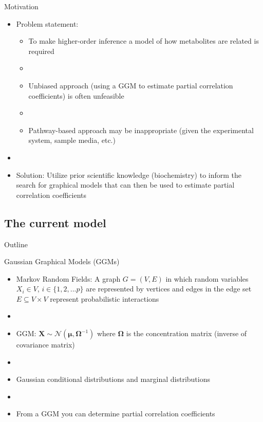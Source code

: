 \documentclass[xcolor=dvipsnames]{beamer}
\begin{document}
\begin{frame}{Motivation}
	\vspace{-15.5pt}
	\begin{itemize}
		\item Problem statement: \pause
		\begin{itemize}
			\item To make higher-order inference a model of how metabolites are related is required \pause
			\item[]
			\item Unbiased approach (using a GGM to estimate partial correlation coefficients) is often unfeasible \pause
			\item[]
			\item Pathway-based approach may be inappropriate (given the experimental system, sample media, etc.) \pause
		\end{itemize}
		\item[]
		\item Solution: Utilize prior scientific knowledge (biochemistry) to inform the search for graphical models that can then be used to estimate partial correlation coefficients
	\end{itemize}
\end{frame}

\subsection{The current model}
\begin{frame}{Outline}
	\vspace{-10.5pt}
	\tableofcontents[currentsection,subsectionstyle=show/shaded/hide]
\end{frame}

\begin{frame}{Gaussian Graphical Models (GGMs)}
	\vspace{-5.5pt}
	\begin{itemize}
		\item Markov Random Fields: A graph $G=(V,E)$ in which random variables $X_i\in V$, $i\in \{1,2,...p\}$ are represented by vertices and edges in the edge set $E \subseteq V \times V$ represent probabilistic interactions \pause
		\item[]
		\item GGM: $\textbf{X}\sim \mathcal{N}(\boldsymbol{\mu},\boldsymbol{\Omega}^{-1})$ where $\boldsymbol{\Omega}$ is the concentration matrix (inverse of covariance matrix) \pause
		\item[]
		\item Gaussian conditional distributions and marginal distributions \pause
		\item[]
		\item From a GGM you can determine partial correlation coefficients 
	\end{itemize}
\end{frame}
\end{document}
